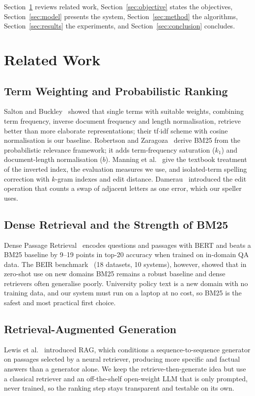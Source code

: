 \documentclass[conference]{IEEEtran}
\begin{document}
Section~\ref{sec:related} reviews related work, Section~\ref{sec:objective} states the objectives, Section~\ref{sec:model} presents the system, Section~\ref{sec:method} the algorithms, Section~\ref{sec:results} the experiments, and Section~\ref{sec:conclusion} concludes.

\section{Related Work}\label{sec:related}

\subsection{Term Weighting and Probabilistic Ranking}
Salton and Buckley~\cite{salton1988term} showed that single terms with suitable weights, combining term frequency, inverse document frequency and length normalisation, retrieve better than more elaborate representations; their tf$\cdot$idf scheme with cosine normalisation is our baseline. Robertson and Zaragoza~\cite{robertson2009bm25} derive BM25 from the probabilistic relevance framework; it adds term-frequency saturation ($k_1$) and document-length normalisation ($b$). Manning et al.~\cite{manning2008ir} give the textbook treatment of the inverted index, the evaluation measures we use, and isolated-term spelling correction with $k$-gram indexes and edit distance. Damerau~\cite{damerau1964} introduced the edit operation that counts a swap of adjacent letters as one error, which our speller uses.

\subsection{Dense Retrieval and the Strength of BM25}
Dense Passage Retrieval~\cite{karpukhin2020dpr} encodes questions and passages with BERT and beats a BM25 baseline by 9--19 points in top-20 accuracy when trained on in-domain QA data. The BEIR benchmark~\cite{thakur2021beir} (18 datasets, 10 systems), however, showed that in zero-shot use on new domains BM25 remains a robust baseline and dense retrievers often generalise poorly. University policy text is a new domain with no training data, and our system must run on a laptop at no cost, so BM25 is the safest and most practical first choice.

\subsection{Retrieval-Augmented Generation}
Lewis et al.~\cite{lewis2020rag} introduced RAG, which conditions a sequence-to-sequence generator on passages selected by a neural retriever, producing more specific and factual answers than a generator alone. We keep the retrieve-then-generate idea but use a classical retriever and an off-the-shelf open-weight LLM that is only prompted, never trained, so the ranking step stays transparent and testable on its own.
\end{document}
